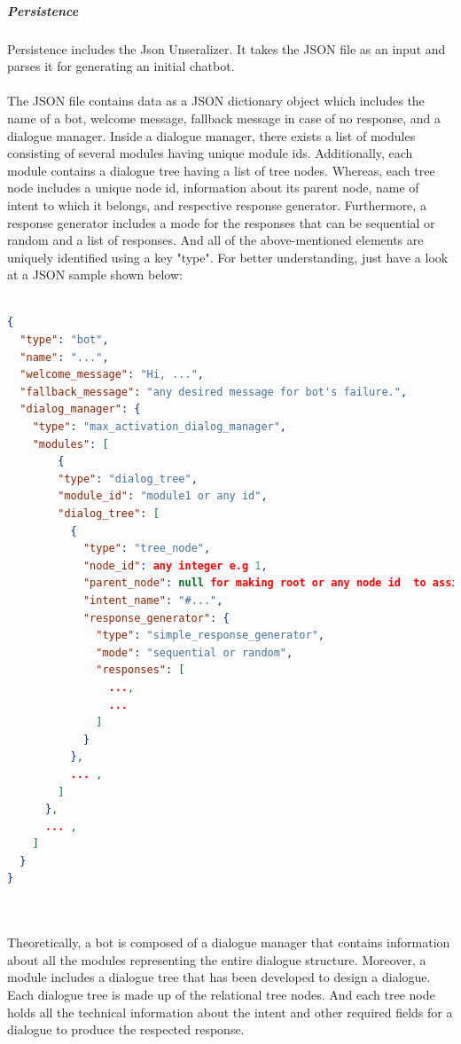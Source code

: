 \subparagraph*{Persistence}
Persistence includes the Json Unseralizer. It takes the JSON file as an input and parses it for generating an initial chatbot.
\\~\\
The JSON file contains data as a JSON dictionary object which includes the name of a bot, welcome message, fallback message in case of no response, and a dialogue manager. Inside a dialogue manager, there exists a list of modules consisting of several modules having unique module ids. Additionally, each module contains a dialogue tree having a list of tree nodes. Whereas, each tree node includes a unique node id, information about its parent node, name of intent to which it belongs, and respective response generator. Furthermore, a response generator includes a mode for the responses that can be sequential or random and a list of responses. And all of the above-mentioned elements are uniquely identified using a key "type". For better understanding, just have a look at a JSON sample shown below:
\\~\\
\begin{lstlisting}[language=json, firstnumber=1, label={lst:botJson}]
{
  "type": "bot",
  "name": "...",
  "welcome_message": "Hi, ...",
  "fallback_message": "any desired message for bot's failure.",
  "dialog_manager": {
    "type": "max_activation_dialog_manager",
    "modules": [
        {
        "type": "dialog_tree",
        "module_id": "module1 or any id",
        "dialog_tree": [
          {
            "type": "tree_node",
            "node_id": any integer e.g 1,
            "parent_node": null for making root or any node id  to assign it a parent,
            "intent_name": "#...",
            "response_generator": {
              "type": "simple_response_generator",
              "mode": "sequential or random",
              "responses": [
                ...,
                ...
              ]
            }
          },
          ... ,
        ]
      },
      ... ,
    ]
  }
}
\end{lstlisting}
\\~\\
Theoretically, a bot is composed of a dialogue manager that contains information about all the modules representing the entire dialogue structure. Moreover, a module includes a dialogue tree that has been developed to design a dialogue. Each dialogue tree is made up of the relational tree nodes. And each tree node holds all the technical information about the intent and other required fields for a dialogue to produce the respected response.
